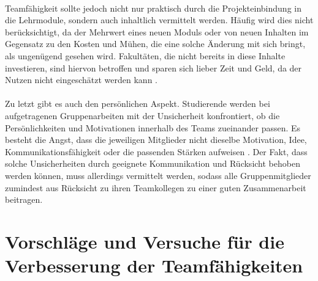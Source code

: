 \documentclass[a4paper]{article}
\begin{document}
\\
Teamfähigkeit sollte jedoch nicht nur praktisch durch die Projekteinbindung in die Lehrmodule, sondern auch inhaltlich vermittelt werden. Häufig wird dies nicht berücksichtigt, da der Mehrwert eines neuen Moduls oder von neuen Inhalten im Gegensatz zu den Kosten und Mühen, die eine solche Änderung mit sich bringt, als ungenügend gesehen wird. Fakultäten, die nicht bereits in diese Inhalte investieren, sind hiervon betroffen und sparen sich lieber Zeit und Geld, da der Nutzen nicht eingeschätzt werden kann \cite{communication_teamwork_engineering}.
\\\\
Zu letzt gibt es auch den persönlichen Aspekt. Studierende werden bei aufgetragenen Gruppenarbeiten mit der Unsicherheit konfrontiert, ob die Persönlichkeiten und Motivationen innerhalb des Teams zueinander passen. Es besteht die Angst, dass die jeweiligen Mitglieder nicht dieselbe Motivation, Idee, Kommunikationsfähigkeit oder die passenden Stärken aufweisen \cite{teamworkstrat_firstsem_engineering}. Der Fakt, dass solche Unsicherheiten durch geeignete Kommunikation und Rücksicht behoben werden können, muss allerdings vermittelt werden, sodass alle Gruppenmitglieder zumindest aus Rücksicht zu ihren Teamkollegen zu einer guten Zusammenarbeit beitragen.\\

\section{Vorschläge und Versuche für die Verbesserung der Teamfähigkeiten}
\end{document}
